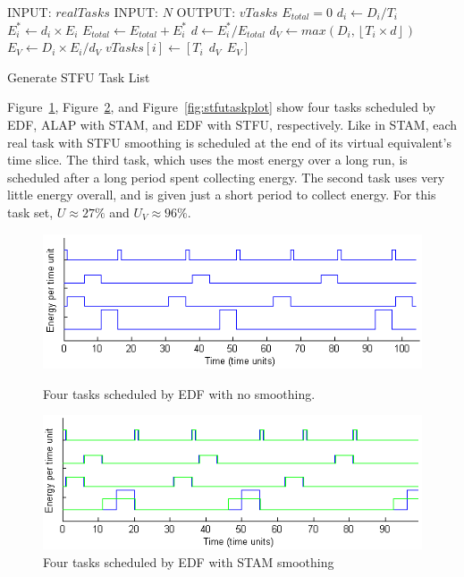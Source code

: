 \begin{algorithm}[htb]
\label{alg:stfualg}
\begin{algorithmic}
\STATE INPUT: $realTasks$  
\STATE INPUT: $N$ 
\STATE OUTPUT: $vTasks$ 
\STATE $E_{total} = 0$
\STATE $d_i \gets D_i / T_i$
\STATE $E_i^* \gets d_i \times E_i$
\STATE $E_{total} \gets E_{total} + E_i^*$
\ENDFOR
{}
\STATE $d \gets E_i^* / E_{total}$
\STATE $d_{V} \gets max(D_i, \left \lfloor T_i \times d \right \rfloor)$
\STATE $E_V \gets D_i \times E_i / d_{V}$
\STATE $vTasks[i] \gets [T_i~~d_{V}~~E_V]$
\ENDFOR
\end{algorithmic}
\caption{Generate \textsc{STFU} Task List}
\end{algorithm}

Figure~\ref{fig:edftasksched}, Figure~\ref{fig:stamtaskplot}, and Figure~\ref{fig:stfutaskplot} show four tasks scheduled by EDF, ALAP with \textsc{STAM}, and EDF with \textsc{STFU}, respectively.  Like in \textsc{STAM}, each real task with \textsc{STFU} smoothing is scheduled at the end of its virtual equivalent's time slice.  The third task, which uses the most energy over a long run, is scheduled after a long period spent collecting energy.  The second task uses very little energy overall, and is given just a short period to collect energy.  For this task set, $U \approx 27\%$ and $U_V \approx 96\%$.


\begin{figure}[htb]
\includegraphics[scale=0.64]{edftasks.png}
\label{fig:edftasksched}
\caption{Four tasks scheduled by EDF with no smoothing.}
\end{figure}

\begin{figure}[htb]
\includegraphics[scale=0.64]{stamtasks.png}
\caption{Four tasks scheduled by EDF with \textsc{STAM} smoothing}
\label{fig:stamtaskplot}
\end{figure}


